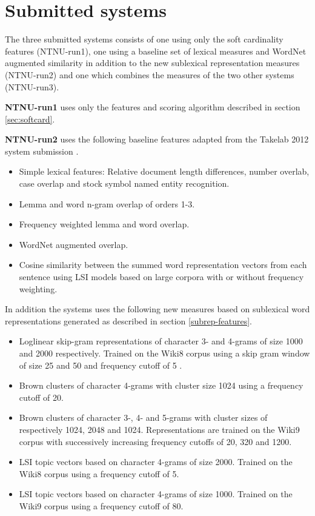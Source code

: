 
\section{Submitted systems}
\label{sec:systems}

The three submitted systems consists of one using only the soft cardinality features (NTNU-run1), one using a baseline set of lexical measures and WordNet augmented similarity in addition to the new sublexical representation measures (NTNU-run2) and one which combines the measures of the two other systems (NTNU-run3).

{\bf NTNU-run1} uses only the features and scoring algorithm described in section \ref{sec:softcard}.

{\bf NTNU-run2} uses the following baseline features adapted from the Takelab 2012 system submission \cite{saric2012takelab}.

\begin{itemize}
\item Simple lexical features: Relative document length differences, number overlab, case overlap and stock symbol named entity recognition.
\item Lemma and word n-gram overlap of orders 1-3.
\item Frequency weighted lemma and word overlap.
\item WordNet augmented overlap.
\item Cosine similarity between the summed word representation vectors from each sentence using LSI models based on large corpora with or without frequency weighting.
\end{itemize}

In addition the systems uses the following new measures based on sublexical word representations generated as described in section \ref{subrep-features}.

\begin{itemize}
\item Loglinear skip-gram representations of character 3- and 4-grams of size 1000 and 2000 respectively. Trained on the Wiki8 corpus using a skip gram window of size 25 and 50 and frequency cutoff of 5 .
\item Brown clusters of character 4-grams with cluster size 1024 using a frequency cutoff of 20.
\item Brown clusters of character 3-, 4- and 5-grams with cluster sizes of respectively 1024, 2048 and 1024. Representations are trained on the Wiki9 corpus with successively increasing frequency cutoffs of 20, 320 and 1200.
\item LSI topic vectors based on character 4-grams of size 2000.   Trained on the Wiki8 corpus using a frequency cutoff of 5.
\item LSI topic vectors based on character 4-grams of size 1000. Trained on the Wiki9 corpus using a frequency cutoff of 80.
\end{itemize}

